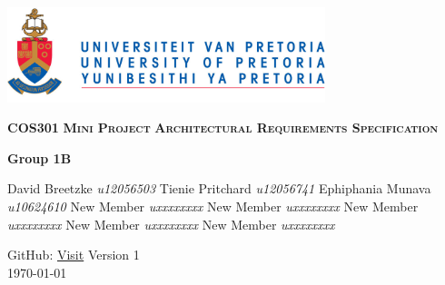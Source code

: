 \begin{titlepage}
\begin{center}
\includegraphics[width=350px]{University_of_Pretoria_Logo.png}
\newline
\newline


\begin{flushright} \large
\textbf {\textsc{\LARGE COS301}}\newline
\textbf {\textsc{\LARGE Mini Project}}\newline
\textbf {\textsc{\LARGE Architectural Requirements Specification}}\newline
\end{flushright}



\textbf{Group 1B} \\
\begin{flushright} \large
David Breetzke \emph{u12056503} \newline
Tienie Pritchard \emph{u12056741} \newline
Ephiphania Munava \emph{u10624610} \newline
New Member \emph{uxxxxxxxx} \newline
New Member \emph{uxxxxxxxx} \newline
New Member \emph{uxxxxxxxx} \newline
New Member \emph{uxxxxxxxx} \newline
New Member \emph{uxxxxxxxx} \newline 
\newline 
\newline
\end{flushright}
GitHub: \href{https://github.com/davidbreetzke/COS_301_Phase2_1B}{Visit}
\vfill
{\large Version 1}
\\
{\large \today}

\end{center}
\end{titlepage}

